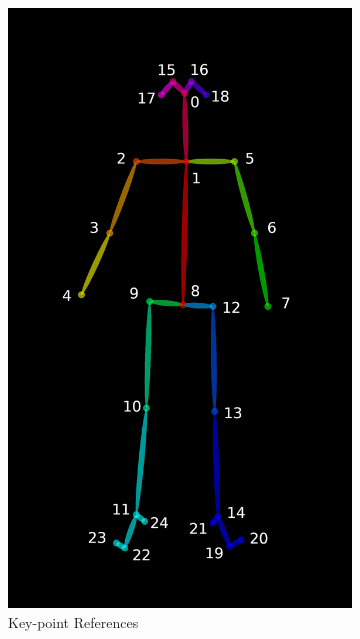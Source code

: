 \begin{figure}[ht]
\begin{subfigure}[b]{.32\textwidth}
		\includegraphics[width=0.765\linewidth]{img/chapter5_implementation/keypoints_pose_25.png}
		\caption{Key-point References}
	\end{subfigure}
	\hspace{\fill} 
	\begin{subfigure}[b]{.32\textwidth}
		\centering

\end{subfigure}
\end{figure}
